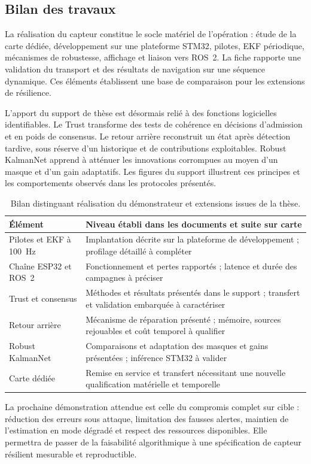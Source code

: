 \subsection{Bilan des travaux}

La réalisation du capteur constitue le socle matériel de l'opération : étude de la carte dédiée, développement sur une plateforme STM32, pilotes, EKF périodique, mécanismes de robustesse, affichage et liaison vers ROS~2. La fiche rapporte une validation du transport et des résultats de navigation sur une séquence dynamique. Ces éléments établissent une base de comparaison pour les extensions de résilience.

L'apport du support de thèse est désormais relié à des fonctions logicielles identifiables. Le Trust transforme des tests de cohérence en décisions d'admission et en poids de consensus. Le retour arrière reconstruit un état après détection tardive, sous réserve d'un historique et de contributions exploitables. Robust KalmanNet apprend à atténuer les innovations corrompues au moyen d'un masque et d'un gain adaptatifs. Les figures du support illustrent ces principes et les comportements observés dans les protocoles présentés.

\begin{table}[!htbp]\centering\small
\begin{tabularx}{\linewidth}{|L{4.4cm}|Y|}\hline
{}\textbf{Élément} & \textbf{Niveau établi dans les documents et suite sur carte}\\\hline
Pilotes et EKF à 100~Hz & Implantation décrite sur la plateforme de développement ; profilage détaillé à compléter\\\hline
Chaîne ESP32 et ROS~2 & Fonctionnement et pertes rapportés ; latence et durée des campagnes à préciser\\\hline
Trust et consensus & Méthodes et résultats présentés dans le support ; transfert et validation embarquée à caractériser\\\hline
Retour arrière & Mécanisme de réparation présenté ; mémoire, sources rejouables et coût temporel à qualifier\\\hline
Robust KalmanNet & Comparaisons et adaptation des masques et gains présentées ; inférence STM32 à valider\\\hline
Carte dédiée & Remise en service et transfert nécessitant une nouvelle qualification matérielle et temporelle\\\hline
\end{tabularx}
\caption{Bilan distinguant réalisation du démonstrateur et extensions issues de la thèse.}
\end{table}

La prochaine démonstration attendue est celle du compromis complet sur cible : réduction des erreurs sous attaque, limitation des fausses alertes, maintien de l'estimation en mode dégradé et respect des ressources disponibles. Elle permettra de passer de la faisabilité algorithmique à une spécification de capteur résilient mesurable et reproductible.
\FloatBarrier
